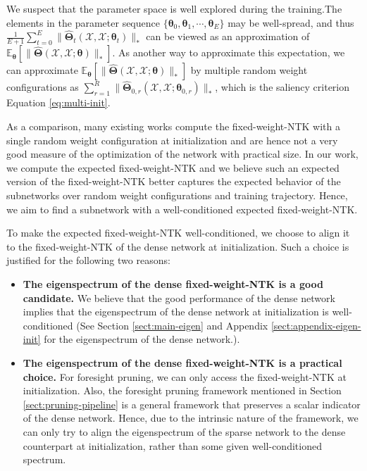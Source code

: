 \documentclass{article} %
\begin{document}
We suspect that the parameter space is well explored during the training.The elements in the parameter sequence $\{\boldsymbol{\theta}_0,\boldsymbol{\theta}_1,\cdots,\boldsymbol{\theta}_E\}$ may be well-spread,  %
and thus 
$
\frac{1}{E+1} \sum_{t=0}^{E} \|\hat{\boldsymbol{\Theta}}_t(\mathcal{X},\mathcal{X}; \boldsymbol{\theta}_t)\|_{*}
$ can be viewed as an approximation
of
$
\mathbb{E}_{\boldsymbol{\theta}  } \left[\|\hat{\boldsymbol{\Theta}}(\mathcal{X},\mathcal{X}; \boldsymbol{\theta})\|_{*}\right]. 
$
As another way to approximate this expectation,
we can  approximate
$
\mathbb{E}_{\boldsymbol{\theta}  } \left[\|\hat{\boldsymbol{\Theta}}(\mathcal{X},\mathcal{X}; \boldsymbol{\theta})\|_{*}\right]
$
by multiple random weight configurations as
$\sum_{r=1}^{R} \|\hat{\boldsymbol{\Theta}}_{0,r}(\mathcal{X},\mathcal{X}; \boldsymbol{\theta}_{0,r})\|_{*}$, which is the saliency criterion Equation \ref{eq:multi-init}.
 
As a comparison, many existing works compute the fixed-weight-NTK with a single random weight configuration at initialization and are hence not a very good measure of the optimization of the network with practical size. In our work, we compute the expected fixed-weight-NTK and we believe such an expected version of the fixed-weight-NTK better captures the expected behavior of the subnetworks over random weight configurations and training trajectory. Hence, we aim to find a subnetwork with a well-conditioned expected fixed-weight-NTK.

To make the expected fixed-weight-NTK well-conditioned, we choose to align it to the fixed-weight-NTK of the dense network at initialization. Such a choice is justified for the following two reasons:
\begin{itemize}
    \item  \textbf{The eigenspectrum of the dense fixed-weight-NTK is a good candidate.} We believe that the good performance of the dense network implies that the eigenspectrum of the dense network at initialization is well-conditioned (See Section \ref{sect:main-eigen} and Appendix \ref{sect:appendix-eigen-init} for the eigenspectrum of the dense network.). 
    \item \textbf{The eigenspectrum of the dense fixed-weight-NTK is a practical choice.} For foresight pruning, we can only access the fixed-weight-NTK at initialization. Also, the foresight pruning framework mentioned in Section \ref{sect:pruning-pipeline} is a general framework that preserves a scalar indicator of the dense network. Hence, due to the intrinsic nature of the framework, we can only try to align the eigenspectrum of the sparse network to the dense counterpart at initialization, rather than some given well-conditioned spectrum.
\end{itemize}
\end{document}

